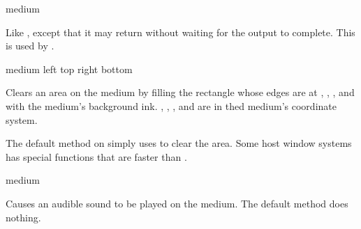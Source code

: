  {medium}

Like , except that it may return  without
waiting for the output to complete.  This is used by .

 {medium left top right bottom}

Clears an area on the {medium}  by filling the rectangle whose edges
are at , , , and  with the medium's
background ink.  , , , and  are in
thed medium's coordinate system.

The default method on  simply uses  to
clear the area.  Some host window systems has special functions that are faster
than .

 {medium}

Causes an audible sound to be played on the medium.  The default method
does nothing.

